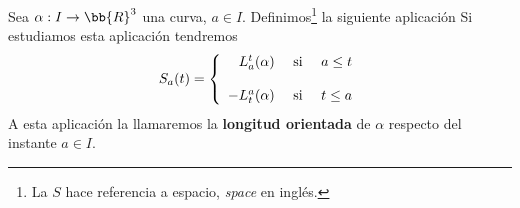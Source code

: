 \begin{definicion}
    Sea $\alpha : I \to \bb{R}^3$ una curva, $a\in I$. Definimos\footnote{La $S$ hace referencia a espacio, \textit{space} en inglés.} la siguiente aplicación
    Si estudiamos esta aplicación tendremos
    \begin{gather*}
        S_a(t) = 
        \left\{
            \begin{array}{r c c}
                L_a^t(\alpha) & \text{ si }& a\leq t\\\\
                -L_t^a(\alpha) & \text{ si } & t \leq a
            \end{array}
        \right.
    \end{gather*}
    A esta aplicación la llamaremos la \textbf{longitud orientada} de $\alpha$ respecto del instante $a\in I$.
\end{definicion}


